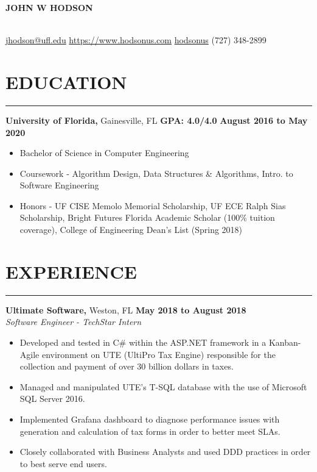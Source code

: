 \documentclass[11pt]{article} %
\begin{document}
	
	\noindent\centerline{ \huge\textbf{JOHN W HODSON}}\\
	
	\noindent\Email\space\href{mailto:jhodson@ufl.edu}{jhodson@ufl.edu} \hspace*{\fill} \ComputerMouse \space \href{https://www.hodsonus.com}{https://www.hodsonus.com} \hspace*{\fill} \faGithub \space \href{https://github.com/hodsonus}{hodsonus} \hspace*{\fill} \Mobilefone \space (727) 348-2899\\
	
	\section*{EDUCATION}
		\hrule \relax
		\vspace{.4cm}
		
		\noindent \textbf{University of Florida,} Gainesville, FL
		\hfill\textbf{GPA: 4.0/4.0}
		\hfill\textbf{August 2016 to May 2020}
		
		\begin{itemize}[noitemsep,nolistsep, label = {-}]
			\item Bachelor of Science in Computer Engineering
			\item Coursework - Algorithm Design, Data Structures \& Algorithms, Intro. to Software Engineering
			\item Honors - UF CISE Memolo Memorial Scholarship, UF ECE Ralph Sias Scholarship, Bright Futures Florida Academic Scholar (100\% tuition coverage), College of Engineering Dean\rq s List (Spring 2018)
		\end{itemize}
		
		\vspace{.1cm}
	
	\section*{EXPERIENCE}
		\hrule \relax
		\vspace{.4cm}
		
		\noindent \textbf{Ultimate Software,} Weston, FL \hfill\textbf{May 2018 to August 2018}\\
		\textit{Software Engineer - TechStar Intern}
		\begin{itemize}[noitemsep,nolistsep, label = {-}]
			\item Developed and tested in C\# within the ASP.NET framework in a Kanban-Agile environment on UTE (UltiPro Tax Engine) responsible for the collection and payment of over 30 billion dollars in taxes.
			\item Managed and manipulated UTE's T-SQL database with the use of Microsoft SQL Server 2016.
			\item Implemented Grafana dashboard to diagnose performance issues with generation and calculation of tax forms in order to better meet SLAs.
			\item Closely collaborated with Business Analysts and used DDD practices in order to best serve end users.
		\end{itemize}
	
\end{document}
